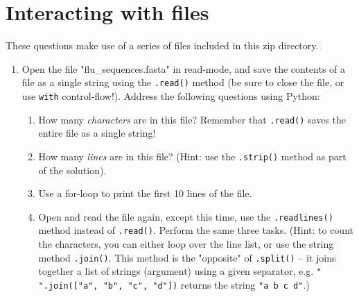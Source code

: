 \documentclass{article}[12pt]
\newcommand{\code}[1]{\texttt{#1}}  %
\begin{document}
\vspace{2.25cm}


\section{Interacting with files}

These questions make use of a series of files included in this zip directory. 

\begin{enumerate}[itemsep=5ex]

	\item Open the file "flu\_sequences.fasta" in read-mode, and save the contents of a file as a single string using the \code{.read()} method (be sure to close the file, or use \code{with} control-flow!). Address the following questions using Python:
	
	\begin{enumerate}[itemsep=2ex]
		\item How many \emph{characters} are in this file? Remember that \code{.read()} saves the entire file as a single string!
		\item How many \emph{lines} are in this file? (Hint: use the \code{.strip()} method as part of the solution).
		\item Use a for-loop to print the first 10 lines of the file.
		\item Open and read the file again, except this time, use the \code{.readlines()} method instead of \code{.read()}. Perform the same three tasks. (Hint: to count the characters, you can either loop over the line list, or use the string method \code{.join()}. This method is the "opposite" of \code{.split()} -- it joins together a list of strings (argument) using a given separator, e.g. \code{" ".join(["a", "b", "c", "d"])} returns the string \code{"a b c d"}.)
	\end{enumerate}
	

\end{enumerate}
\end{document}
